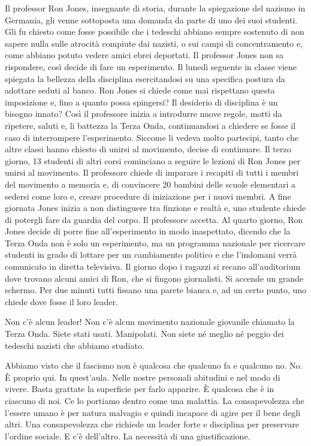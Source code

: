 \documentclass[12pt]{book} %
\begin{document}
\begin{mdframed}[linewidth=1pt]
Il professor Ron Jones, insegnante di storia, durante la spiegazione del nazismo in Germania, gli venne sottoposta una
domanda da parte di uno dei suoi studenti. Gli fu chiesto come fosse possibile che i tedeschi abbiano sempre sostenuto
di non sapere nulla sulle atrocità compiute dai nazisti, o sui campi di concentramento e, come abbiano potuto vedere
amici ebrei deportati. Il professor Jones non sa rispondere, così decide di fare un esperimento. Il lunedì seguente in
classe viene spiegata la bellezza della disciplina esercitandosi su una specifica postura da adottare seduti al banco.
Ron Jones si chiede come mai rispettano questa imposizione e, fino a quanto possa spingersi? Il desiderio di disciplina
è un bisogno innato? Così il professore inizia a introdurre nuove regole, motti da ripetere, saluti e, li battezza la
Terza Onda, continuandosi a chiedere se fosse il caso di interrompere l'esperimento. Siccome li
vedeva molto partecipi, tanto che altre classi hanno chiesto di unirsi al movimento, decise di continuare. Il terzo
giorno, 13 studenti di altri corsi cominciano a seguire le lezioni di Ron Jones per unirsi al movimento. Il professore
chiede di imparare i recapiti di tutti i membri del movimento a memoria e, di convincere 20 bambini delle scuole
elementari a sedersi come loro e, creare procedure di iniziazione per i nuovi membri. A fine giornata Jones inizia a
non distinguere tra finzione e realtà e, uno studente chiede di potergli fare da guardia del corpo. Il professore
accetta. Al quarto giorno, Ron Jones decide di porre fine all'esperimento in modo inaspettato,
dicendo che la Terza Onda non è solo un esperimento, ma un programma nazionale per ricercare studenti in grado di
lottare per un cambiamento politico e che l'indomani verrà comunicato in diretta televisiva. Il
giorno dopo i ragazzi si recano all'auditorium dove trovano alcuni amici di Ron, che si fingono
giornalisti. Si accende un grande schermo. Per due minuti tutti fissano una parete bianca e, ad un certo punto, uno
chiede dove fosse il loro leader.

Non c'è alcun leader! Non c'è alcun movimento nazionale giovanile chiamato la
Terza Onda. Siete stati usati. Manipolati. Non siete né meglio né peggio dei tedeschi nazisti che abbiamo studiato.

Abbiamo visto che il fascismo non è qualcosa che qualcuno fa e qualcuno no. No. È proprio qui. In
quest'aula. Nelle nostre personali abitudini e nel modo di vivere. Basta grattate la superficie
per farlo apparire. È qualcosa che è in ciascuno di noi. Ce lo portiamo dentro come una malattia. La consapevolezza che
l'essere umano è per natura malvagio e quindi incapace di agire per il bene degli altri. Una
consapevolezza che richiede un leader forte e disciplina per preservare l'ordine sociale. E
c'è dell'altro. La necessità di una giustificazione.


\end{mdframed}
\end{document}
